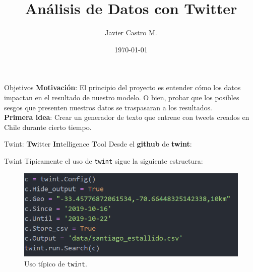 \documentclass{beamer}
\title[Análisis de Datos con Twitter]{Análisis de Datos con Twitter}
\author{Javier Castro M.}
\institute{Universidad De Chile}
\date{\today}
\begin{document}
	
	\maketitle
	
	\begin{frame}{Objetivos}
		\textbf{Motivación}: El principio del proyecto es entender cómo los datos impactan en el resultado de nuestro modelo. O bien, probar que los posibles sesgos que presenten nuestros datos se traspasaran a los resultados.\\
		\vspace{1cm}
		\textbf{Primera idea}: Crear un generador de texto que entrene con tweets creados en Chile durante cierto tiempo.
	\end{frame}

	\begin{frame}{Twint: \textbf{Tw}itter \textbf{In}telligence \textbf{T}ool}
		Desde el \textbf{github} de \textbf{twint}: \\
		\vspace{1cm}
	\end{frame}

	\begin{frame}{Twint}
		Típicamente el uso de \texttt{twint} sigue la siguiente estructura:
		\begin{figure}
			\centering
			\includegraphics[scale=.5]{../imgs/twint_code_example_visual.png}
			\caption{Uso típico de \texttt{twint}.}
		\end{figure}
	\end{frame}
\end{document}
